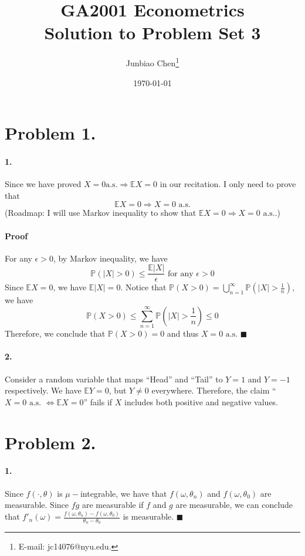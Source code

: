 \documentclass[11pt]{article}
\title{GA2001 Econometrics \\Solution to Problem Set 3}
\author{
Junbiao Chen\thanks{E-mail: jc14076@nyu.edu.}
}
\date{\today}
\theoremstyle{definition}
\theoremstyle{boldtitle} %
\numberwithin{equation}{section}
\numberwithin{figure}{section}
\numberwithin{table}{section}
\begin{document}
\maketitle
\section*{Problem 1.}
\paragraph{1.} Since we have proved $X = 0 \text{a.s.} \Rightarrow \mathbb{E} X = 0$ in our recitation.
I only need to prove that 
\[
\mathbb{E}X = 0 \Rightarrow X = 0 \text{ a.s.}
\]
\vspace{-3mm}
\noindent (Roadmap: I will use Markov inequality to show that $\mathbb{E}X = 0 \Rightarrow X = 0 \text{ a.s.}$.)
\paragraph{Proof} For any $\epsilon > 0$, by Markov inequality, we have
\[
\mathbb{P}(|X| > 0) \leq \frac{\mathbb{E}|X|}{\epsilon} \text{ for any } \epsilon > 0
\]
Since $\mathbb{E}X = 0$, we have $\mathbb{E}|X| = 0$.
Notice that $\mathbb{P}(X > 0) = \bigcup_{n=1}^\infty \mathbb{P}(|X| > \frac{1}{n})$,
we have
\[\mathbb{P}(X > 0) \leq \sum_{n=1}^\infty \mathbb{P}(|X| > \frac{1}{n}) \leq 0\]
Therefore, we conclude that $\mathbb{P}(X > 0) = 0$ and thus $X = 0 \text{ a.s.}$
\(\blacksquare\)


\paragraph{2.} Consider a random variable that maps ``Head'' and ``Tail'' to 
$Y = 1$ and $Y= -1$ respectively.
We have $\mathbb{E}Y = 0$, but $Y \neq 0$ everywhere. 
Therefore, the claim ``$X = 0 \text{ a.s. } \Leftrightarrow \mathbb{E}X = 0$'' fails 
if $X$ includes both positive and negative values.





\section*{Problem 2.}
\paragraph{1.} Since $f(\cdot, \theta)$ is $\mu-$integrable, we have that $f(\omega, \theta_n)$ and  $f(\omega, \theta_0)$ are measurable.
Since $f g$ are measurable if $f$ and $g$ are measurable, 
we can conclude that $f'_n(\omega) = \frac{f(\omega, \theta_n) - f(\omega, \theta_0)}{\theta_n - \theta_0}$ is measurable. \(\blacksquare\)
\end{document}
